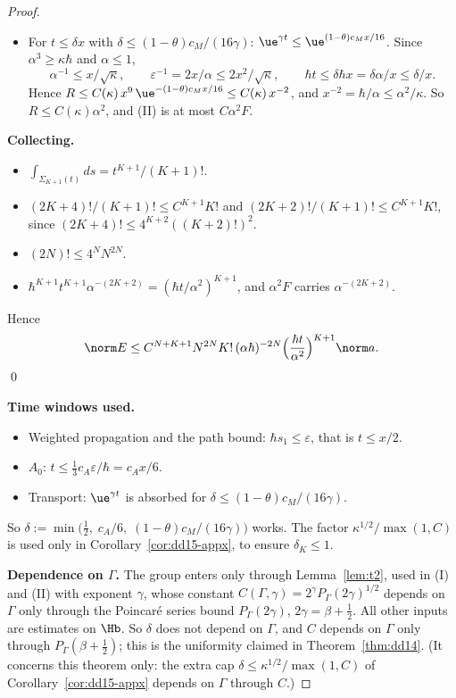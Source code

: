 \begin{proof}
\begin{itemize}
factor is at most $C\varepsilon^{-3}F$ and the unweighted one at most $C\alpha^{-4}\ue^{-c_Mx/8}F$. After the H\"older split, using $\varepsilon,\alpha\le1$,
\[
\text{(II)}\le C\,F\,R,\qquad R:=\hbar t\,\ue^{\gamma t}\,\varepsilon^{-3}\,\alpha^{-4}\,\ue^{-(1-\theta)c_Mx/8}.
\]
\item For $t\le\delta x$ with $\delta\le(1-\theta)c_M/(16\gamma)$: $\ue^{\gamma t}\le\ue^{(1-\theta)c_Mx/16}$. Since $\alpha^3\ge\kappa\hbar$ and $\alpha\le1$,
\[
\alpha^{-1}\le x/\sqrt\kappa,\qquad\varepsilon^{-1}=2x/\alpha\le2x^2/\sqrt\kappa,\qquad\hbar t\le\delta\hbar x=\delta\alpha/x\le\delta/x .
\]
Hence $R\le C(\kappa)\,x^{9}\,\ue^{-(1-\theta)c_Mx/16}\le C(\kappa)\,x^{-2}$, and $x^{-2}=\hbar/\alpha\le\alpha^2/\kappa$. So $R\le C(\kappa)\alpha^2$, and
(II) is at most $C\alpha^2F$.
\end{itemize}

\medskip\noindent\textbf{Collecting.}
\begin{itemize}
\item $\int_{\Sigma_{K+1}(t)}ds=t^{K+1}/(K+1)!$.
\item $(2K+4)!/(K+1)!\le C^{K+1}K!$ and $(2K+2)!/(K+1)!\le C^{K+1}K!$, since $(2K+4)!\le4^{K+2}((K+2)!)^2$.
\item $(2N)!\le4^NN^{2N}$.
\item $\hbar^{K+1}t^{K+1}\alpha^{-(2K+2)}=(\hbar t/\alpha^2)^{K+1}$, and $\alpha^2F$ carries $\alpha^{-(2K+2)}$.
\end{itemize}
Hence
\[
\norm E\le C^{N+K+1}N^{2N}K!\,(\alpha\hbar)^{-2N}\Bigl(\frac{\hbar t}{\alpha^2}\Bigr)^{K+1}\norm a.
\]
\qed

\medskip\noindent\textbf{Time windows used.}
\begin{itemize}
\item Weighted propagation and the path bound: $\hbar s_1\le\varepsilon$, that is $t\le x/2$.
\item $A_0$: $t\le\tfrac13c_A\varepsilon/\hbar=c_Ax/6$.
\item Transport: $\ue^{\gamma t}$ is absorbed for $\delta\le(1-\theta)c_M/(16\gamma)$.
\end{itemize}
So $\delta:=\min\bigl(\tfrac12,\;c_A/6,\;(1-\theta)c_M/(16\gamma)\bigr)$ works. The factor $\kappa^{1/2}/\max(1,C)$ is used only in Corollary~\ref{cor:dd15-appx}, to ensure $\delta_K\le1$.

\medskip\noindent\textbf{Dependence on $\Gamma$.} The group enters only through Lemma~\ref{lem:t2}, used in (I) and (II) with exponent $\gamma$, whose
constant $C(\Gamma,\gamma)=2^\gamma P_\Gamma(2\gamma)^{1/2}$ depends on $\Gamma$ only through the Poincar\'e series bound $P_\Gamma(2\gamma)$, $2\gamma=\beta+\tfrac12$.
All other inputs are estimates on $\Hb$. So $\delta$ does not depend on $\Gamma$, and $C$ depends on $\Gamma$ only through $P_\Gamma(\beta+\tfrac12)$;
this is the uniformity claimed in Theorem~\ref{thm:dd14}. (It concerns this theorem only: the extra cap $\delta\le\kappa^{1/2}/\max(1,C)$ of
Corollary~\ref{cor:dd15-appx} depends on $\Gamma$ through $C$.)
\end{proof}


